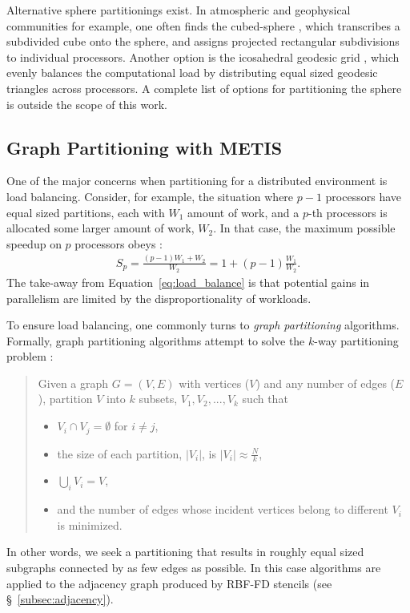 \documentclass{report}
\begin{document}
Alternative sphere partitionings exist. In atmospheric and geophysical communities for example, one often finds the cubed-sphere \cite{Ivan2011, Katta2012}, which transcribes a subdivided cube onto the sphere, and assigns projected rectangular subdivisions to individual processors. Another option is the icosahedral geodesic grid \cite{Randall2002}, which evenly balances the computational load by distributing equal sized geodesic triangles across processors. A complete list of options for partitioning the sphere is outside the scope of this work. %


\subsection{Graph Partitioning with METIS}

One of the major concerns when partitioning for a distributed environment is load balancing. Consider, for example, the situation where $p-1$ processors have equal sized partitions, each with $W_1$ amount of work, and a $p$-th processors is allocated some larger amount of work, $W_2$. In that case, the maximum possible speedup on $p$ processors obeys \cite{Gropp1990}:  
\begin{align}
S_p = \frac{(p-1) W_1 + W_2}{W_2} = 1 + (p-1)\frac{W_1}{W_2}.
\label{eq:load_balance}
\end{align}
The take-away from Equation~\ref{eq:load_balance} is that potential gains in parallelism are limited by the disproportionality of workloads. 

To ensure load balancing, one commonly turns to \emph{graph partitioning} algorithms. Formally, graph partitioning algorithms attempt to solve the $k$-way partitioning problem \cite{Karypis1999}: 

\begin{quote} Given a graph $G = (V,E)$ with vertices ($V$) and any number of edges ($E$), partition $V$ into $k$ subsets, $V_1, V_2, ..., V_k$ such that 
\begin{itemize} 
\item $V_i \cap V_j = \emptyset$ for $i \neq j$,
\item the size of each partition, $|V_i|$, is $|V_i| \approx \frac{N}{k}$, 
\item $\bigcup_i V_i = V$,
\item and the number of edges whose incident vertices belong to different $V_i$ is minimized.
\end{itemize}
\end{quote} 
In other words, we seek a partitioning that results in roughly equal sized subgraphs connected by as few edges as possible. 
In this case algorithms are applied to the adjacency graph produced by RBF-FD stencils (see \S~\ref{subsec:adjacency}).
\end{document}
